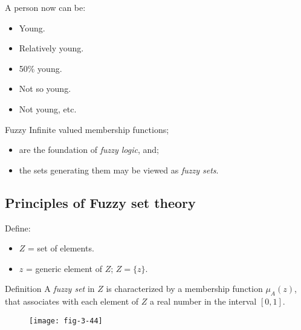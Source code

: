 
\begin{frame}
A person now can be:
\begin{itemize}
\item Young.
\item Relatively young.
\item 50\% young.
\item Not so young.
\item Not young, etc.
\end{itemize}
\end{frame}


\begin{frame}
\begin{block}{Fuzzy}
Infinite valued membership functions;
\begin{itemize}
\item are the foundation of \textit{fuzzy logic}, and;
\item the sets generating them may be viewed as \textit{fuzzy sets}.
\end{itemize}
\end{block}
\end{frame}


\subsection{Principles of Fuzzy set theory}


\begin{frame}
Define:
\begin{itemize}
\item $Z$ = set of elements.
\item $z$ = generic element of $Z$; $Z=\{z\}$.
\end{itemize}
\begin{block}{Definition}
A \textit{fuzzy set} in $Z$ is characterized by a membership function $\mu_{A}(z)$, that associates with each element of $Z$ a real number in the interval $[0,1]$.
\end{block}
\begin{figure}
\centering
\texttt{[image: fig-3-44]}
\end{figure}
\end{frame}


